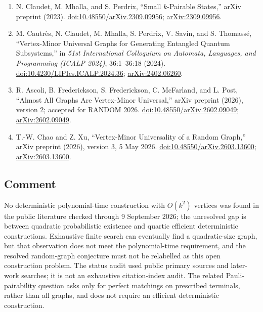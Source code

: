 \begin{enumerate}[label={},leftmargin=4.8em,labelsep=0.5em]
  \footnotesize
  \item[\textup{[CMP23]}]\label{ref:gvu-small-pairable}
  N. Claudet, M. Mhalla, and S. Perdrix, ``Small $k$-Pairable States,'' arXiv preprint (2023). \href{https://doi.org/10.48550/arXiv.2309.09956}{doi:10.48550/arXiv.2309.09956}; \href{https://arxiv.org/abs/2309.09956}{arXiv:2309.09956}.

  \item[\textup{[CCM+24]}]\label{ref:gvu-universal}
  M. Cautrès, N. Claudet, M. Mhalla, S. Perdrix, V. Savin, and S. Thomassé, ``Vertex-Minor Universal Graphs for Generating Entangled Quantum Subsystems,'' in \emph{51st International Colloquium on Automata, Languages, and Programming (ICALP 2024)}, 36:1–36:18 (2024). \href{https://doi.org/10.4230/LIPIcs.ICALP.2024.36}{doi:10.4230/LIPIcs.ICALP.2024.36}; \href{https://arxiv.org/abs/2402.06260}{arXiv:2402.06260}.

  \item[\textup{[AFF+26]}]\label{ref:gvu-random}
  R. Ascoli, B. Frederickson, S. Frederickson, C. McFarland, and L. Post, ``Almost All Graphs Are Vertex-Minor Universal,'' arXiv preprint (2026), version 2; accepted for RANDOM 2026. \href{https://doi.org/10.48550/arXiv.2602.09049}{doi:10.48550/arXiv.2602.09049}; \href{https://arxiv.org/abs/2602.09049}{arXiv:2602.09049}.

  \item[\textup{[CX26]}]\label{ref:gvu-random-regimes}
  T.-W. Chao and Z. Xu, ``Vertex-Minor Universality of a Random Graph,'' arXiv preprint (2026), version 3, 5 May 2026. \href{https://doi.org/10.48550/arXiv.2603.13600}{doi:10.48550/arXiv.2603.13600}; \href{https://arxiv.org/abs/2603.13600}{arXiv:2603.13600}.
\end{enumerate}

\subsection*{Comment}

No deterministic polynomial-time construction with $O(k^2)$ vertices was found in the public literature checked through 9 September 2026; the unresolved gap is between quadratic probabilistic existence and quartic efficient deterministic constructions. Exhaustive finite search can eventually find a quadratic-size graph, but that observation does not meet the polynomial-time requirement, and the resolved random-graph conjecture must not be relabelled as this open construction problem. The status audit used public primary sources and later-work searches; it is not an exhaustive citation-index audit. The related Pauli-pairability question asks only for perfect matchings on prescribed terminals, rather than all graphs, and does not require an efficient deterministic construction.

